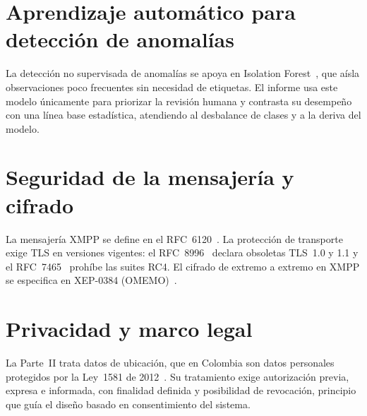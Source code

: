 \section{Aprendizaje autom\'atico para detecci\'on de anomal\'ias}
La detecci\'on no supervisada de anomal\'ias se apoya en Isolation Forest~\cite{iforest}, que a\'isla observaciones poco frecuentes sin necesidad de etiquetas. El informe usa este modelo \'unicamente para priorizar la revisi\'on humana y contrasta su desempe\~no con una l\'inea base estad\'istica, atendiendo al desbalance de clases y a la deriva del modelo.

\section{Seguridad de la mensajer\'ia y cifrado}
La mensajer\'ia XMPP se define en el RFC~6120~\cite{rfc6120}. La protecci\'on de transporte exige TLS en versiones vigentes: el RFC~8996~\cite{rfc8996} declara obsoletas TLS~1.0 y 1.1 y el RFC~7465~\cite{rfc7465} proh\'ibe las suites RC4. El cifrado de extremo a extremo en XMPP se especifica en XEP-0384 (OMEMO)~\cite{omemo}.

\section{Privacidad y marco legal}
La Parte~II trata datos de ubicaci\'on, que en Colombia son datos personales protegidos por la Ley~1581 de 2012~\cite{ley1581}. Su tratamiento exige autorizaci\'on previa, expresa e informada, con finalidad definida y posibilidad de revocaci\'on, principio que gu\'ia el dise\~no basado en consentimiento del sistema.
